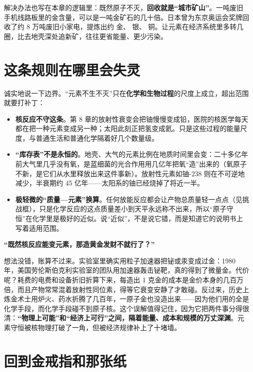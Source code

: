解决办法也写在本章的逻辑里：既然原子不灭，\textbf{回收就是“城市矿山”}。一吨废旧手机线路板里的金含量，可以是一吨金矿石的几十倍。日本曾为东京奥运会奖牌回收了约 8 万吨废旧小家电，提炼出约  金、 银、 铜。让元素在经济系统里多转几圈，比去地壳深处追新矿，往往更省能量、更少污染。

\section{这条规则在哪里会失灵}

诚实地说一下边界。“元素不生不灭”只在\textbf{化学和生物过程}的尺度上成立，超出范围就要打补丁：

\begin{itemize}[itemsep=2pt]
\item \textbf{核反应不守这条}。第 8 章的放射性衰变会把铀慢慢变成铅，医院的核医学每天都在把一种元素变成另一种；太阳此刻正把氢变成氦。只是这些过程的能量尺度，与普通生活和普通化学隔着好几个数量级。
\item \textbf{“库存表”不是永恒的}。地壳、大气的元素比例在地质时间里会变：二十多亿年前大气里几乎没有氧，是蓝细菌的光合作用用几亿年把氧“造”出来的（氧原子不新，是它们从水里释放出来这件事新）。放射性元素如铀-238 则在不可逆地减少，半衰期约 45 亿年——太阳系的铀已经烧掉了将近一半。
\item \textbf{极轻微的“质量—元素”换算}。任何放能反应都会让产物总质量轻一点点（见挑战框），只是化学反应的这点质量差小到天平永远称不出来，所以“原子守恒”在化学里是极好的近似。说“近似”，不是说它错，而是知道它的说明书上写着适用范围。
\end{itemize}

\begin{wuqu}
\textbf{“既然核反应能变元素，那造黄金发财不就行了？”}

想法没错，账算不过来。实验室里确实用粒子加速器把铋或汞变成过金：1980 年，美国劳伦斯伯克利实验室的团队用加速器轰击铋靶，真的得到了微量金。代价呢？耗费的电费和设备折旧折算下来，每造出 1 克金的成本是金价本身的几百万倍，而且产物常常混着放射性同位素，得等它衰变安静了才敢碰。反过来，历史上炼金术士用炉火、药水折腾了几百年，一原子金也没造出来——因为他们用的全是化学手段，而化学手段碰不到原子核。这个误解值得记住，因为它把两件事分得很清：\textbf{“物理上可能”和“经济上可行”之间，隔着能量、成本和规模的万丈深渊}。元素守恒被核物理打破了一角，但被经济规律补上了十堵墙。
\end{wuqu}

\section{回到金戒指和那张纸}

